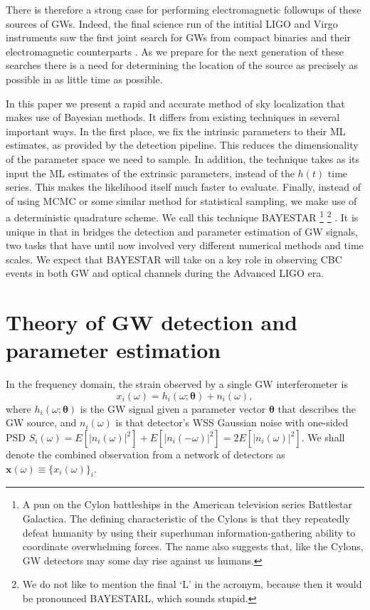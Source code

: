 \documentclass{iopart}
\begin{document}
There is therefore a strong case for performing electromagnetic followups of these sources of \acp{GW}. Indeed, the final science run of the intitial LIGO and Virgo instruments saw the first joint search for \acp{GW} from compact binaries and their electromagnetic counterparts \cite{abadie2012first}.  As we prepare for the next generation of these searches there is a need for determining the location of the source as precisely as possible in as little time as possible.

In this paper we present a rapid and accurate method of sky localization that makes use of Bayesian methods. It differs from existing techniques in several important ways.  In the first place, we fix the intrinsic parameters to their \ac{ML} estimates, as provided by the detection pipeline.  This reduces the dimensionality of the parameter space we need to sample. In addition, the technique takes as its input the \ac{ML} estimates of the extrinsic parameters, instead of the $h(t)$ time series. This makes the likelihood itself much faster to evaluate. Finally, instead of of using \ac{MCMC} or some similar method for statistical sampling, we make use of a deterministic quadrature scheme. We call this technique \ac{BAYESTAR}%
%
\footnote{A pun on the Cylon battleships in the American television series Battlestar Galactica. The defining characteristic of the Cylons is that they repeatedly defeat humanity by using their superhuman information\nobreakdashes-gathering ability to coordinate overwhelming forces. The name also suggests that, like the Cylons, \ac{GW} detectors may some day rise against us humans.}%
%
\footnote{We do not like to mention the final `L' in the acronym, because then it would be pronounced BAYESTARL, which sounds stupid.}%
. It is unique in that in bridges the detection and parameter estimation of \ac{GW} signals, two tasks that have until now involved very different numerical methods and time scales. We expect that \ac{BAYESTAR} will take on a key role in observing \ac{CBC} events in both \ac{GW} and optical channels during the Advanced \ac{LIGO} era.

\section{Theory of \ac{GW} detection and parameter estimation}

In the frequency domain, the strain observed by a single \ac{GW} interferometer is
%
\begin{equation}\label{eq:signal-model}
    x_i (\omega) = h_i (\omega; \boldsymbol\theta) + n_i (\omega),
\end{equation}
%
where $h_i (\omega; \boldsymbol\theta)$ is the \ac{GW} signal given a parameter vector $\boldsymbol\theta$ that describes the \ac{GW} source, and $n_i (\omega)$ is that detector's \ac{WSS} Gaussian noise with one\nobreakdashes-sided \ac{PSD} $S_i(\omega) = E\left[\left|n_i(\omega)\right|^2\right] + E\left[\left|n_i(-\omega)\right|^2\right] = 2 E\left[\left|n_i(\omega)\right|^2\right]$. We shall denote the combined observation from a network of detectors as $\mathbf x (\omega) \equiv \{x_i (\omega)\}_i$.
\end{document}
